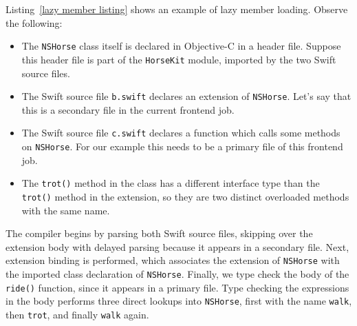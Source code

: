 \documentclass[../generics]{subfiles}
\begin{document}
\begin{example}
Listing~\ref{lazy member listing} shows an example of lazy member loading. Observe the following:
\begin{itemize}
\item The \texttt{NSHorse} class itself is declared in Objective-C in a header file. Suppose this header file is part of the \texttt{HorseKit} module, imported by the two Swift source files.
\item The Swift source file \texttt{b.swift} declares an extension of \texttt{NSHorse}. Let's say that this is a secondary file in the current frontend job.
\item The Swift source file \texttt{c.swift} declares a function which calls some methods on \texttt{NSHorse}. For our example this needs to be a primary file of this frontend job.
\item The \texttt{trot()} method in the class has a different interface type than the \texttt{trot()} method in the extension, so they are two distinct overloaded methods with the same name.
\end{itemize}
The compiler begins by parsing both Swift source files, skipping over the extension body with delayed parsing because it appears in a secondary file. Next, extension binding is performed, which associates the extension of \texttt{NSHorse} with the imported class declaration of \texttt{NSHorse}. Finally, we type check the body of the \texttt{ride()} function, since it appears in a primary file. Type checking the expressions in the body performs three direct lookups into \texttt{NSHorse}, first with the name \texttt{walk}, then \texttt{trot}, and finally \texttt{walk} again.

\newcommand{\LookupTableEntry}[1]{{\setlength{\fboxrule}{0pt}\fbox{\begin{tabular}{@{}l@{}}#1\end{tabular}}}}

\newcommand{\LookupTableElt}[1]{
\begin{tikzpicture}
\node [rounded corners, fill=light-gray] {#1};
\end{tikzpicture}
}

\smallskip


\end{example}
\end{document}
